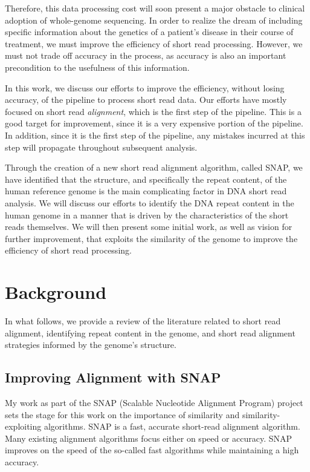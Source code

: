 \documentclass[twocolumn,10pt]{article}
\begin{document}
Therefore, this data processing cost will soon present a major obstacle to clinical adoption of whole-genome sequencing.  In order to realize the dream of including specific information about the genetics of a patient's disease in their course of treatment, we must improve the efficiency of short read processing.  However, we must not trade off accuracy in the process, as accuracy is also an important precondition to the usefulness of this information.

In this work, we discuss our efforts to improve the efficiency, without losing accuracy, of the pipeline to process short read data.  Our efforts have mostly focused on short read \textit{alignment}, which is the first step of the pipeline.  This is a good target for improvement, since it is a very expensive portion of the pipeline.  In addition, since it is the first step of the pipeline, any mistakes incurred at this step will propagate throughout subsequent analysis.  

Through the creation of a new short read alignment algorithm, called SNAP, we have identified that the structure, and specifically the repeat content, of the human reference genome is the main complicating factor in DNA short read analysis.  We will discuss our efforts to identify the DNA repeat content in the human genome in a manner that is driven by the characteristics of the short reads themselves.  We will then present some initial work, as well as vision for further improvement, that exploits the similarity of the genome to improve the efficiency of short read processing.

\section{Background}

In what follows, we provide a review of the literature related to short read alignment, identifying repeat content in the genome, and short read alignment strategies informed by the genome's structure.

\subsection{Improving Alignment with SNAP}
\label{section:SNAP}

My work as part of the SNAP (Scalable Nucleotide Alignment Program) project sets the stage for this work on the importance of similarity and similarity-exploiting algorithms.  SNAP is a fast, accurate short-read alignment algorithm.  Many existing alignment algorithms focus either on speed or accuracy.  SNAP improves on the speed of the so-called fast algorithms while maintaining a high accuracy.
\end{document}
